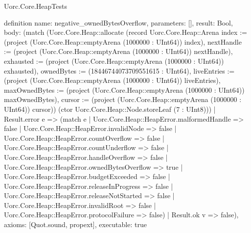 \begin{lexlean}{Uorc.Core.HeapTests}
\begin{semanticmodule}
definition{
  name: negative_ownedBytesOverflow,
  parameters: [],
  result: Bool,
  body: (match (Uorc.Core.Heap::allocate (record Uorc.Core.Heap::Arena {index := (project (Uorc.Core.Heap::emptyArena (1000000 : UInt64)) index), nextHandle := (project (Uorc.Core.Heap::emptyArena (1000000 : UInt64)) nextHandle), exhausted := (project (Uorc.Core.Heap::emptyArena (1000000 : UInt64)) exhausted), ownedBytes := (18446744073709551615 : UInt64), liveEntries := (project (Uorc.Core.Heap::emptyArena (1000000 : UInt64)) liveEntries), maxOwnedBytes := (project (Uorc.Core.Heap::emptyArena (1000000 : UInt64)) maxOwnedBytes), cursor := (project (Uorc.Core.Heap::emptyArena (1000000 : UInt64)) cursor)}) (ctor Uorc.Core.Heap::Node.storeLeaf (7 : UInt8)))
    | Result.error e => (match e
      | Uorc.Core.Heap::HeapError.malformedHandle => false
      | Uorc.Core.Heap::HeapError.invalidNode => false
      | Uorc.Core.Heap::HeapError.countOverflow => false
      | Uorc.Core.Heap::HeapError.countUnderflow => false
      | Uorc.Core.Heap::HeapError.handleOverflow => false
      | Uorc.Core.Heap::HeapError.ownedBytesOverflow => true
      | Uorc.Core.Heap::HeapError.budgetExceeded => false
      | Uorc.Core.Heap::HeapError.releaseInProgress => false
      | Uorc.Core.Heap::HeapError.releaseNotStarted => false
      | Uorc.Core.Heap::HeapError.invalidRoot => false
      | Uorc.Core.Heap::HeapError.protocolFailure => false)
    | Result.ok v => false),
  axioms: [Quot.sound, propext],
  executable: true
}


\end{semanticmodule}
\end{lexlean}
